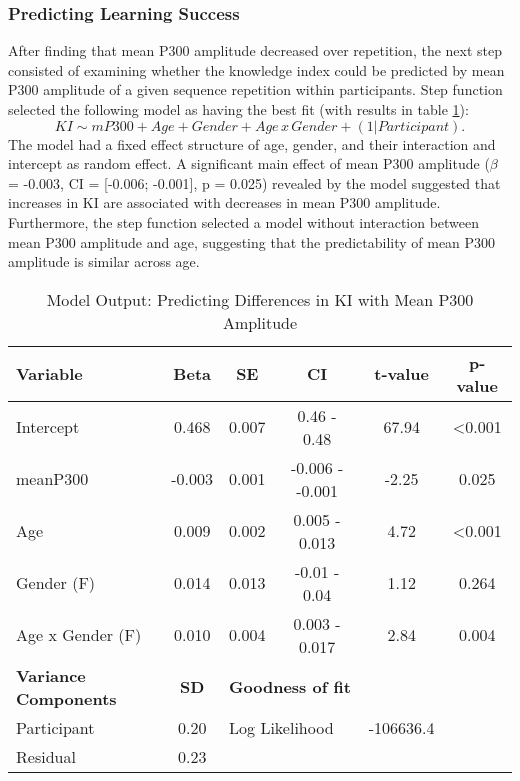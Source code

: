 \subsubsection{Predicting Learning Success}
After finding that mean P300 amplitude decreased over repetition, the next step consisted of examining whether the knowledge index could be predicted by mean P300 amplitude of a given sequence repetition within participants. Step function selected the following model as having the best fit (with results in table \ref{tab:predKI}): 
\begin{equation}\label{eq:mPre2}
KI \sim mP300 + Age + Gender +  Age \,x\, Gender + (1 | Participant).
\end{equation}
The model had a fixed effect structure of age, gender, and their interaction and intercept as random effect.
A significant main effect of mean P300 amplitude ($\beta$ = -0.003, CI = [-0.006; -0.001], p = 0.025) revealed by the model suggested that increases in KI are associated with decreases in mean P300 amplitude. Furthermore, the step function selected a model without interaction between mean P300 amplitude and age, suggesting that the predictability of mean P300 amplitude is similar across age. 
\begin{table}[H]
\centering
\begin{tabular}{lccccc}
\hline
\textbf{Variable}            & \textbf{Beta} & \textbf{SE}          & \textbf{CI}           & \textbf{t-value} & \textbf{p-value} \\ \hline
Intercept                    & 0.468         & 0.007                & 0.46 - 0.48           & 67.94            & \textless{}0.001 \\
meanP300                          & -0.003         & 0.001                & -0.006 - -0.001           & -2.25          & 0.025 \\
Age                          & 0.009         & 0.002                & 0.005 - 0.013           & 4.72             & \textless{}0.001  \\
Gender (F)                 &0.014      & 0.013                & -0.01 - 0.04           & 1.12            & 0.264\\
Age x Gender (F)                    & 0.010         & 0.004                & 0.003 - 0.017         & 2.84             & 0.004 \\\hline
\textbf{Variance Components} & \textbf{SD}   & \multicolumn{2}{l}{\textbf{Goodness of fit}} & \textbf{}        & \textbf{}        \\ \hline
Participant                  & 0.20          & \multicolumn{2}{l}{Log Likelihood}           & -106636.4         &                  \\

Residual                     & 0.23          &                      &                       &                  &                  \\ \hline

\end{tabular}
\caption{Model Output: Predicting Differences in KI with Mean P300 Amplitude}
\label{tab:predKI}
\end{table}
